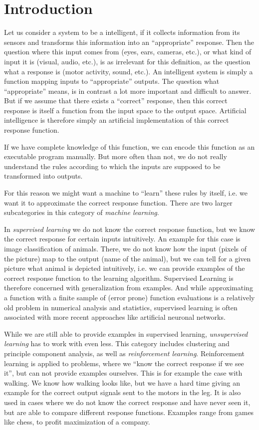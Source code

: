 
\chapter{Introduction}
    Let us consider a system to be a intelligent, if it collects information from its sensors and transforms this information into an ``appropriate'' response. Then the question where this input comes from (eyes, ears, cameras, etc.), or what kind of input it is (visual, audio, etc.), is as irrelevant for this definition, as the question what a response is (motor activity, sound, etc.). An intelligent system is simply a function mapping inputs to ``appropriate'' outputs.  The question what ``appropriate'' means, is in contrast a lot more important and difficult to answer. But if we assume that there exists a ``correct'' response, then this correct response is itself a function from the input space to the output space. Artificial intelligence is therefore simply an artificial implementation of this correct response function. 

    If we have complete knowledge of this function, we can encode this function as an executable program manually. But more often than not, we do not really understand the rules according to which the inputs are supposed to be transformed into outputs. 

    For this reason we might want a machine to ``learn'' these rules by itself, i.e. we want it to approximate the correct response function. There are two larger subcategories in this category of \emph{machine learning}. 
    
    In \emph{supervised learning} we do not know the correct response function, but we know the correct response for certain inputs intuitively. An example for this case is image classification of animals. There, we do not know how the input (pixels of the picture) map to the output (name of the animal), but we can tell for a given picture what animal is depicted intuitively, i.e. we can provide examples of the correct response function to the learning algorithm. Supervised Learning is therefore concerned with generalization from examples. And while approximating a function with a finite sample of (error prone) function evaluations is a relatively old problem in numerical analysis and statistics, supervised learning is often associated with more recent approaches like artificial neuronal networks. 

    While we are still able to provide examples in supervised learning, \emph{unsupervised learning} has to work with even less. This category includes clustering and principle component analysis, as well as \emph{reinforcement learning}. Reinforcement learning is applied to problems, where we ``know the correct response if we see it'', but can not provide examples ourselves. This is for example the case with walking. We know how walking looks like, but we have a hard time giving an example for the correct output signals sent to the motors in the leg. It is also used in cases where we do not know the correct response and have never seen it, but are able to compare different response functions. Examples range from games like chess, to profit maximization of a company. 

